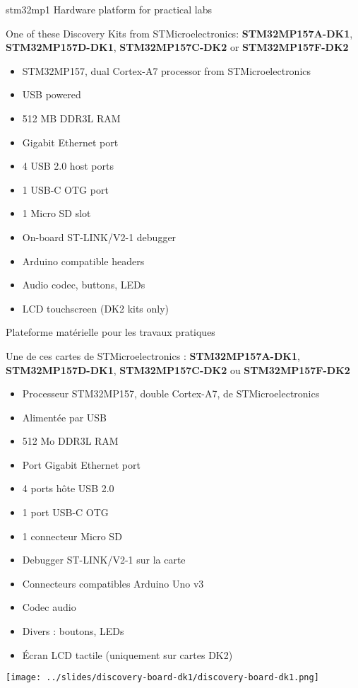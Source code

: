 {stm32mp1}
{Hardware platform for practical labs}
{
  One of these Discovery Kits from STMicroelectronics: {\bf
  STM32MP157A-DK1}, {\bf STM32MP157D-DK1}, {\bf STM32MP157C-DK2} or
  {\bf STM32MP157F-DK2}
  \begin{itemize}
  \item STM32MP157, dual Cortex-A7 processor from STMicroelectronics
  \item USB powered
  \item 512 MB DDR3L RAM
  \item Gigabit Ethernet port
  \item 4 USB 2.0 host ports
  \item 1 USB-C OTG port
  \item 1 Micro SD slot
  \item On-board ST-LINK/V2-1 debugger
  \item Arduino compatible headers
  \item Audio codec, buttons, LEDs
  \item LCD touchscreen (DK2 kits only)
  \end{itemize}
}
{Plateforme matérielle pour les travaux pratiques}
{
  Une de ces cartes de STMicroelectronics : {\bf
  STM32MP157A-DK1}, {\bf STM32MP157D-DK1}, {\bf STM32MP157C-DK2} ou
  {\bf STM32MP157F-DK2}
  \begin{itemize}
  \item Processeur STM32MP157, double Cortex-A7, de STMicroelectronics
  \item Alimentée par USB
  \item 512 Mo DDR3L RAM
  \item Port Gigabit Ethernet port
  \item 4 ports hôte USB 2.0
  \item 1 port USB-C OTG
  \item 1 connecteur Micro SD
  \item Debugger ST-LINK/V2-1 sur la carte
  \item Connecteurs compatibles Arduino Uno v3
  \item Codec audio
  \item Divers : boutons, LEDs
  \item Écran LCD tactile (uniquement sur cartes DK2)
  \end{itemize}
}
{
  \begin{center}
    \texttt{[image: ../slides/discovery-board-dk1/discovery-board-dk1.png]}
  \end{center}
}

